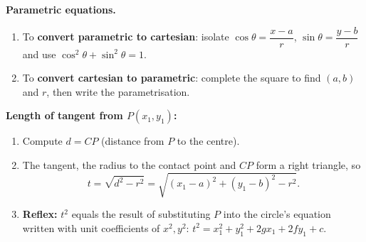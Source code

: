 \documentclass[11pt]{article}
\newcommand{\legende}[1]{\par\vspace{6pt}{\popsemi\fontsize{9}{11.5}\selectfont\color{popmuted}#1}}
\begin{document}
\begin{methode}
\textbf{Parametric equations.}
\begin{enumerate}
\item To \textbf{convert parametric to cartesian}: isolate $\cos\theta=\dfrac{x-a}{r}$, $\sin\theta=\dfrac{y-b}{r}$ and use $\cos^2\theta+\sin^2\theta=1$.
\item To \textbf{convert cartesian to parametric}: complete the square to find $(a,b)$ and $r$, then write the parametrisation.
\end{enumerate}
\textbf{Length of tangent from $P(x_1,y_1)$:}
\begin{enumerate}
\item Compute $d=CP$ (distance from $P$ to the centre).
\item The tangent, the radius to the contact point and $CP$ form a right triangle, so
      \[
      t=\sqrt{d^2-r^2}=\sqrt{(x_1-a)^2+(y_1-b)^2-r^2}.
      \]
\item \textbf{Reflex:} $t^2$ equals the result of substituting $P$ into the circle's equation written with unit coefficients of $x^2,y^2$: $t^2=x_1^2+y_1^2+2gx_1+2fy_1+c$.
\end{enumerate}
\end{methode}

\begin{popfigure}
\legende{Right triangle: $t^2 = d^2 - r^2$}
\end{popfigure}
\end{document}
